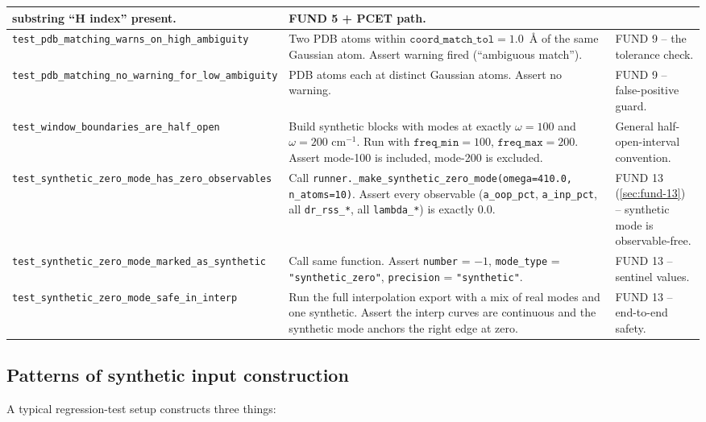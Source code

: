 \documentclass[10pt,a4paper,twoside]{article}
\newcommand{\fn}[1]{\texttt{#1}}
\newcommand{\cfgkey}[1]{\texttt{#1}}
\begin{document}
\begin{longtable}{p{} p{} p{}}
   substring ``H index'' present.
 & FUND 5 + PCET path. \\
\midrule
\texttt{test\_pdb\_matching\_warns\_on\_high\_ambiguity}
 & Two PDB atoms within $\cfgkey{coord\_match\_tol} = 1.0$~\AA{} of
   the same Gaussian atom. Assert warning fired (``ambiguous
   match'').
 & FUND 9 -- the tolerance check. \\
\midrule
\texttt{test\_pdb\_matching\_no\_warning\_for\_low\_ambiguity}
 & PDB atoms each at distinct Gaussian atoms. Assert no warning.
 & FUND 9 -- false-positive guard. \\
\midrule
\texttt{test\_window\_boundaries\_are\_half\_open}
 & Build synthetic blocks with modes at exactly $\omega = 100$
   and $\omega = 200$ cm$^{-1}$. Run with $\cfgkey{freq\_min} = 100$,
   $\cfgkey{freq\_max} = 200$. Assert mode-100 is included,
   mode-200 is excluded.
 & General half-open-interval convention. \\
\midrule
\texttt{test\_synthetic\_zero\_mode\_has\_zero\_observables}
 & Call \fn{runner.\_make\_synthetic\_zero\_mode(omega=410.0,
   n\_atoms=10)}. Assert every observable
   (\texttt{a\_oop\_pct}, \texttt{a\_inp\_pct}, all
   \texttt{dr\_rss\_*}, all \texttt{lambda\_*}) is exactly $0.0$.
 & FUND 13 (\cref{sec:fund-13}) -- synthetic mode is observable-free. \\
\midrule
\texttt{test\_synthetic\_zero\_mode\_marked\_as\_synthetic}
 & Call same function. Assert \texttt{number} = $-1$,
   \texttt{mode\_type} = \texttt{"synthetic\_zero"},
   \texttt{precision} = \texttt{"synthetic"}.
 & FUND 13 -- sentinel values. \\
\midrule
\texttt{test\_synthetic\_zero\_mode\_safe\_in\_interp}
 & Run the full interpolation export with a mix of real modes
   and one synthetic. Assert the interp curves are continuous and
   the synthetic mode anchors the right edge at zero.
 & FUND 13 -- end-to-end safety. \\
\bottomrule
\end{longtable}

\subsection{Patterns of synthetic input construction}

A typical regression-test setup constructs three things:
\end{document}
